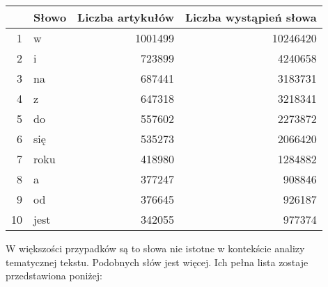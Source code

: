 \documentclass[12pt, twoside, openany]{report}\usepackage[]{graphicx}\usepackage[]{color}
\theoremstyle{plain}
\begin{document}
\begin{tabular}{rlrr}
  \hline
 & Słowo & Liczba artykułów & Liczba wystąpień słowa \\ 
  \hline
1 & w & 1001499 & 10246420 \\ 
  2 & i & 723899 & 4240658 \\ 
  3 & na & 687441 & 3183731 \\ 
  4 & z & 647318 & 3218341 \\ 
  5 & do & 557602 & 2273872 \\ 
  6 & się & 535273 & 2066420 \\ 
  7 & roku & 418980 & 1284882 \\ 
  8 & a & 377247 & 908846 \\ 
  9 & od & 376645 & 926187 \\ 
  10 & jest & 342055 & 977374 \\ 
   \hline
\end{tabular}



W większości przypadków są to słowa nie istotne w kontekście analizy tematycznej tekstu. Podobnych słów jest więcej. Ich pełna lista zostaje przedstawiona poniżej:
\end{document}
